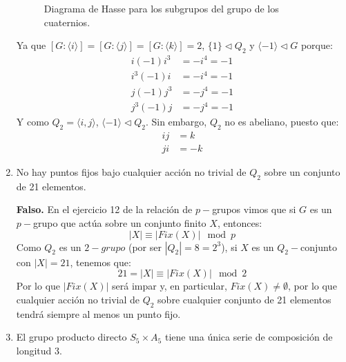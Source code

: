 \documentclass[12pt]{article}
\begin{document}
\begin{ejercicio}[5 puntos]
\begin{enumerate}
\begin{figure}[H]
                    \caption{Diagrama de Hasse para los subgrupos del grupo de los cuaternios.}
                \end{figure}
                Ya que $[G:\langle i \rangle ] = [G:\langle j \rangle ] = [G:\langle k \rangle ] = 2$, $\{1\}\lhd Q_2$ y $\langle -1 \rangle \lhd G $ porque:
                \begin{align*}
                    i(-1)i^3 &= -i^4 = -1 \\
                    i^3(-1)i &= -i^4 = -1 \\
                    j(-1)j^3 &= -j^4 = -1 \\
                    j^3(-1)j &= -j^4 = -1 
                \end{align*}
                Y como $Q_2 = \langle i,j \rangle $, $\langle -1 \rangle \lhd Q_2$. Sin embargo, $Q_2$ no es abeliano, puesto que:
                \begin{align*}
                    ij &= k \\
                    ji &= -k
                \end{align*}
            \item No hay puntos fijos bajo cualquier acción no trivial de $Q_2$ sobre un conjunto de 21 elementos.
                
                \textbf{Falso.} En el ejercicio 12 de la relación de $p-$grupos vimos que si $G$ es un $p-$grupo que actúa sobre un conjunto finito $X$, entonces:
                \begin{equation*}
                    |X| \equiv |Fix(X)| \mod p
                \end{equation*}
                Como $Q_2$ es un $2-grupo$ (por ser $|Q_2| = 8 = 2^3$), si $X$ es un $Q_2-$conjunto con $|X| = 21$, tenemos que:
                \begin{equation*}
                    21 = |X| \equiv |Fix(X)| \mod 2
                \end{equation*}
                Por lo que $|Fix(X)|$ será impar y, en particular, $Fix(X)\neq \emptyset $, por lo que cualquier acción no trivial de $Q_2$ sobre cualquier conjunto de 21 elementos tendrá siempre al menos un punto fijo.
            \item El grupo producto directo $S_5\times A_5$ tiene una única serie de composición de longitud 3.


\end{enumerate}
\end{ejercicio}
\end{document}
